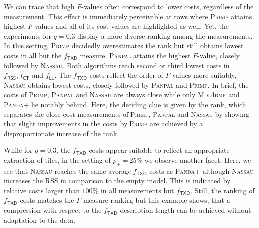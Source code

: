 We can trace that high $F$-values often correspond to lower costs, regardless of the measurement. This effect is immediately perceivable at rows where \textsc{Primp} attains highest $F$-values and all of its cost values are highlighted as well. Yet, the experiments for $q=0.3$ display a  more diverse ranking among the measurements. In this setting, \textsc{Primp} decidedly overestimates the rank but still obtains lowest costs in all but the $f_\mathsf{TXD}$ measure. \textsc{Panpal} attains the highest $F$-value, closely followed by \textsc{Nassau}. Both algorithms reach second or third lowest costs in $f_{\mathsf{RSS}},f_{\mathsf{CT}}$ and $f_{\mathsf{L1}}$. The $f_\mathsf{TXD}$ costs reflect the order of $F$-values more suitably, \textsc{Nassau} obtains lowest costs, closely followed by \textsc{Panpal} and \textsc{Primp}. In brief, the costs of \textsc{Primp}, \textsc{Panpal} and \textsc{Nassau} are always close while only \textsc{Mdl4bmf} and \textsc{Panda+} lie notably behind. Here, the deciding clue is given by the rank, which separates the close cost measurements of \textsc{Primp}, \textsc{Panpal} and \textsc{Nassau} by showing that slight improvements in the costs by \textsc{Primp} are achieved by a disproportionate increase of the rank. 

While for $q=0.3$, the $f_\mathsf{TXD}$ costs appear suitable to reflect an appropriate extraction of tiles, in the setting of $p_\pm=25\%$ we observe another facet. Here, we see that  \textsc{Nassau} reaches the same average $f_\mathsf{TXD}$ costs as \textsc{Panda+} although \textsc{Nassau} increases the RSS in comparison to the empty model. This is indicated by relative costs larger than $100\%$ in all measurements but $f_\mathsf{TXD}$. Still, the ranking of  $f_\mathsf{TXD}$ costs matches the $F$-measure ranking but this example shows, that a compression with respect to the $f_\mathsf{TXD}$ description length can be achieved without adaptation to the data.

